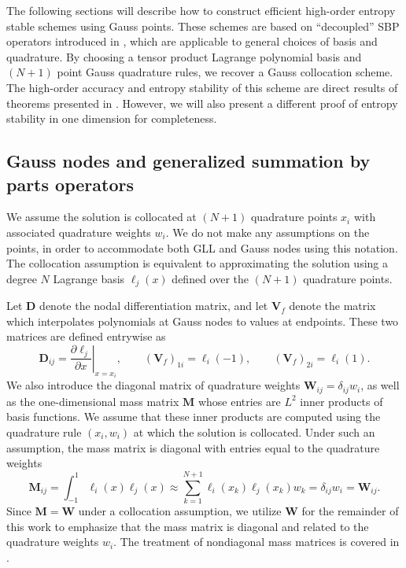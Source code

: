\documentclass[review,onefignum,onetabnum,final]{siamart171218}
\newcommand{\pd}[2]{\frac{\partial#1}{\partial#2}}
\newcommand{\LRp}[1]{\left( #1 \right)}
\newcommand{\LRl}[1]{\left. #1 \right|}
\newcommand{\note}[1]{{\color{blue}{#1}}}
\begin{document}
The following sections will describe how to construct efficient high-order entropy stable schemes using Gauss points.  These schemes are based on ``decoupled'' SBP operators introduced in \cite{chan2017discretely, chan2018discretely}, which are applicable to general choices of basis and quadrature.  By choosing a tensor product Lagrange polynomial basis and $(N+1)$ point Gauss quadrature rules, we recover a Gauss collocation scheme.  The high-order accuracy and entropy stability of this scheme are direct results of theorems presented in  \cite{chan2017discretely, chan2018discretely}.  However, we will also present a different proof of entropy stability in one dimension for completeness.  

\subsection{Gauss nodes and generalized summation by parts operators}
\label{sec:gsbp}
We assume the solution is collocated at $(N+1)$ quadrature points $x_i$ with associated quadrature weights $w_i$.  We do not make any assumptions on the points, in order to accommodate both GLL and Gauss nodes using this notation.  The collocation assumption is equivalent to approximating the solution using a degree $N$ Lagrange basis $\ell_j(x)$ defined over the $(N+1)$ quadrature points.  

Let $\bm{D}$ denote the nodal differentiation matrix, and let $\bm{V}_f$ denote the \note{$2\times (N+1)$} matrix which interpolates polynomials at Gauss nodes to values at endpoints.  These two matrices are defined entrywise as
\[
\bm{D}_{ij} = \LRl{\pd{\ell_j}{x}}_{x = x_i}, \qquad \LRp{\bm{V}_f}_{1i} = \ell_i(-1), \qquad  \LRp{\bm{V}_f}_{2i} = \ell_i(1).
\]
We also introduce the diagonal matrix of quadrature weights $\bm{W}_{ij} = \delta_{ij} w_i$, as well as the one-dimensional mass matrix $\bm{M}$ whose entries are $L^2$ inner products of basis functions.  We assume that these inner products are computed using the quadrature rule $(x_i, w_i)$ at which the solution is collocated.  Under such an assumption, the mass matrix is diagonal with entries equal to the quadrature weights
\[
\bm{M}_{ij} = \int_{-1}^1 \ell_i(x)\ell_j(x) \approx \sum_{k=1}^{N+1} \ell_i(x_k)\ell_j(x_k) w_k = \delta_{ij} w_i = \bm{W}_{ij}.
\]
Since $\bm{M} = \bm{W}$ under a collocation assumption, we utilize $\bm{W}$ for the remainder of this work to emphasize that the mass matrix is diagonal and related to the quadrature weights $w_i$.  The treatment of nondiagonal mass matrices is covered in \cite{chan2017discretely, chan2018discretely}.
\end{document}
